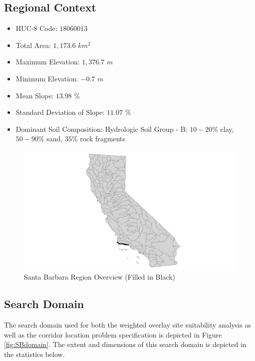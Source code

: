     \subsection{Regional Context}
    
    \begin{itemize}
      \setlength{\itemsep}{0cm}
      \setlength{\parskip}{0cm}
        \item HUC-8 Code: $18060013$
        \item Total Area: $1,173.6$ $km^2$
        \item Maximum Elevation: $1,376.7$ $m$
        \item Minimum Elevation: $-0.7$ $m$
        \item Mean Slope: $13.98$ $\%$
        \item Standard Deviation of Slope: $11.07$ $\%$
        \item Dominant Soil Composition: Hydrologic Soil Group - B: $10-20\%$ clay, $50-90\%$ sand, $35\%$ rock fragments
    \end{itemize}
    
        \begin{figure}[!h]
            \begin{center}
            \includegraphics[width=5.5in]{figures/SantaBarbara_Overview.png}   
            \caption{Santa Barbara Region Overview (Filled in Black)}
            \label{fig:SBoverview}
            \end{center}
        \end{figure}

    \subsection{Search Domain}

The search domain used for both the weighted overlay site suitability analysis as well as the corridor location problem specification is depicted in Figure \ref{fig:SBdomain}. The extent and dimensions of this search domain is depicted in the statistics below.
    
